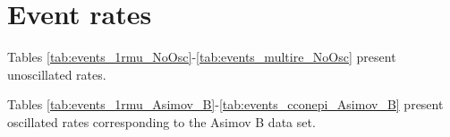 \section{Event rates}
\label{app:event_rates}

Tables \ref{tab:events_1rmu_NoOsc}-\ref{tab:events_multire_NoOsc} present unoscillated rates.






Tables \ref{tab:events_1rmu_Asimov_B}-\ref{tab:events_cconepi_Asimov_B} present oscillated rates corresponding to the Asimov B data set.






\clearpage